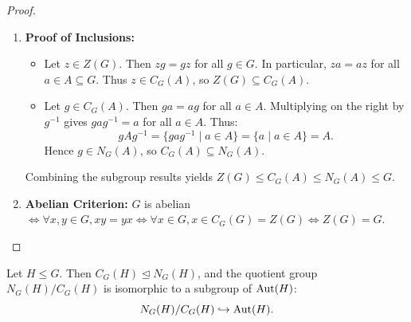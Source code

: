 \begin{proof}
\begin{enumerate}[label=\textbf{(\roman*)}, leftmargin=*, itemsep=8pt]
    \item \textbf{Proof of Inclusions:}
    \begin{itemize}[leftmargin=1.5em, itemsep=4pt]
        \item Let $z \in Z(G)$. Then $zg = gz$ for all $g \in G$. In particular, $za = az$ for all $a \in A \subseteq G$. Thus $z \in C_G(A)$, so $Z(G) \subseteq C_G(A)$.
        \item Let $g \in C_G(A)$. Then $ga = ag$ for all $a \in A$.
        Multiplying on the right by $g^{-1}$ gives $gag^{-1} = a$ for all $a \in A$.
        Thus:
        \begin{equation*}
        gAg^{-1} = \{ gag^{-1} \mid a \in A \} = \{ a \mid a \in A \} = A.
        \end{equation*}
        Hence $g \in N_G(A)$, so $C_G(A) \subseteq N_G(A)$.
    \end{itemize}
    Combining the subgroup results yields $Z(G) \le C_G(A) \le N_G(A) \le G$.

    \item \textbf{Abelian Criterion:}
    $G$ is abelian $\iff \forall x, y \in G, xy = yx \iff \forall x \in G, x \in C_G(G) = Z(G) \iff Z(G) = G$.
\end{enumerate}
\end{proof}

\begin{theorem}
\label{thm:nc_theorem}
Let $H \le G$. Then $C_G(H) \trianglelefteq N_G(H)$, and the quotient group $N_G(H)/C_G(H)$ is isomorphic to a subgroup of $\operatorname{Aut}(H)$:
\begin{equation}
N_G(H)/C_G(H) \hookrightarrow \operatorname{Aut}(H).
\end{equation}
\end{theorem}


